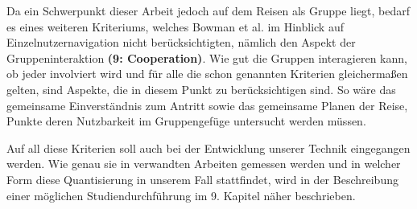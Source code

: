 Da ein Schwerpunkt dieser Arbeit jedoch auf dem Reisen als Gruppe liegt, bedarf es eines weiteren Kriteriums, welches Bowman et al. im Hinblick auf Einzelnutzernavigation nicht berücksichtigten, nämlich den Aspekt der Gruppeninteraktion \textbf{(9: Cooperation)}. Wie gut die Gruppen interagieren kann, ob jeder involviert wird und für alle die schon genannten Kriterien gleichermaßen gelten, sind Aspekte, die in diesem Punkt zu berücksichtigen sind.
So wäre das gemeinsame Einverständnis zum \glqq Antritt\grqq{} sowie das gemeinsame Planen der Reise, Punkte deren Nutzbarkeit im Gruppengefüge untersucht werden müssen.

Auf all diese Kriterien soll auch bei der Entwicklung unserer Technik eingegangen werden. Wie genau sie in verwandten Arbeiten gemessen werden und in welcher Form diese Quantisierung in unserem Fall stattfindet, wird in der Beschreibung einer möglichen Studiendurchführung im 9. Kapitel näher beschrieben.